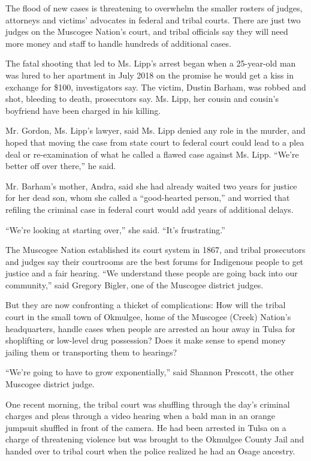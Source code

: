 The flood of new cases is threatening to overwhelm the smaller rosters
of judges, attorneys and victims' advocates in federal and tribal
courts. There are just two judges on the Muscogee Nation's court, and
tribal officials say they will need more money and staff to handle
hundreds of additional cases.

The fatal shooting that led to Ms. Lipp's arrest began when a
25-year-old man was lured to her apartment in July 2018 on the promise
he would get a kiss in exchange for \$100, investigators say. The
victim, Dustin Barham, was robbed and shot, bleeding to death,
prosecutors say. Ms. Lipp, her cousin and cousin's boyfriend have been
charged in his killing.

Mr. Gordon, Ms. Lipp's lawyer, said Ms. Lipp denied any role in the
murder, and hoped that moving the case from state court to federal court
could lead to a plea deal or re-examination of what he called a flawed
case against Ms. Lipp. ``We're better off over there,'' he said.

Mr. Barham's mother, Andra, said she had already waited two years for
justice for her dead son, whom she called a ``good-hearted person,'' and
worried that refiling the criminal case in federal court would add years
of additional delays.

``We're looking at starting over,'' she said. ``It's frustrating.''

The Muscogee Nation established its court system in 1867, and tribal
prosecutors and judges say their courtrooms are the best forums for
Indigenous people to get justice and a fair hearing. ``We understand
these people are going back into our community,'' said Gregory Bigler,
one of the Muscogee district judges.

But they are now confronting a thicket of complications: How will the
tribal court in the small town of Okmulgee, home of the Muscogee (Creek)
Nation's headquarters, handle cases when people are arrested an hour
away in Tulsa for shoplifting or low-level drug possession? Does it make
sense to spend money jailing them or transporting them to hearings?

``We're going to have to grow exponentially,'' said Shannon Prescott,
the other Muscogee district judge.

One recent morning, the tribal court was shuffling through the day's
criminal charges and pleas through a video hearing when a bald man in an
orange jumpsuit shuffled in front of the camera. He had been arrested in
Tulsa on a charge of threatening violence but was brought to the
Okmulgee County Jail and handed over to tribal court when the police
realized he had an Osage ancestry.

